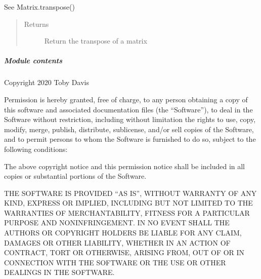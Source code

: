 \documentclass[letterpaper,10pt,english]{sphinxmanual}
\begin{document}
\begin{fulllineitems}
\begin{fulllineitems}
\begin{quote}
\begin{description}
\end{description}\end{quote}

\end{fulllineitems}


\begin{fulllineitems}
\label{\detokenize{libpymath.matrix:libpymath.matrix.matrix.Matrix.transposed}}
See Matrix.transpose()
\begin{quote}\begin{description}
\item[{Returns}] \leavevmode
Return the transpose of a matrix

\end{description}\end{quote}

\end{fulllineitems}


\end{fulllineitems}



\subparagraph{Module contents}
\label{\detokenize{libpymath.matrix:module-libpymath.matrix}}\label{\detokenize{libpymath.matrix:module-contents}}
Copyright 2020 Toby Davis

Permission is hereby granted, free of charge, to any person obtaining a copy of
this software and associated documentation files (the “Software”), to deal in
the Software without restriction, including without limitation the rights to
use, copy, modify, merge, publish, distribute, sublicense, and/or sell copies
of the Software, and to permit persons to whom the Software is furnished to do
so, subject to the following conditions:

The above copyright notice and this permission notice shall be included in all
copies or substantial portions of the Software.

THE SOFTWARE IS PROVIDED “AS IS”, WITHOUT WARRANTY OF ANY KIND, EXPRESS OR
IMPLIED, INCLUDING BUT NOT LIMITED TO THE WARRANTIES OF MERCHANTABILITY, FITNESS
FOR A PARTICULAR PURPOSE AND NONINFRINGEMENT. IN NO EVENT SHALL THE AUTHORS OR
COPYRIGHT HOLDERS BE LIABLE FOR ANY CLAIM, DAMAGES OR OTHER LIABILITY, WHETHER
IN AN ACTION OF CONTRACT, TORT OR OTHERWISE, ARISING FROM, OUT OF OR IN
CONNECTION WITH THE SOFTWARE OR THE USE OR OTHER DEALINGS IN THE SOFTWARE.
\end{document}
